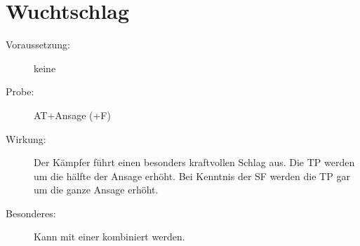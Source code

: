 \section{Wuchtschlag}
\label{aktion.wuchtschlag}
\begin{description}
    \item[Voraussetzung:]
        keine
    \item[Probe:]
        AT+Ansage (+F)
    \item[Wirkung:]
        Der Kämpfer führt einen besonders kraftvollen Schlag aus.
        Die TP werden um die hälfte der Ansage erhöht.
        Bei Kenntnis der SF  werden die TP gar um die ganze Ansage erhöht.
    \item[Besonderes:]
        Kann mit einer  kombiniert werden.
\end{description}
